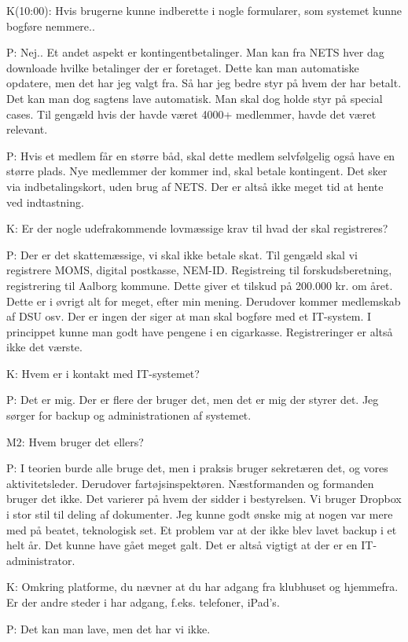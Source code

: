 \documentclass{article}
\begin{document}
K(10:00): Hvis brugerne kunne indberette i nogle formularer, som systemet kunne bogføre nemmere..

P: Nej.. Et andet aspekt er kontingentbetalinger. Man kan fra NETS hver dag downloade hvilke betalinger der er foretaget. Dette kan man automatiske opdatere, men det har jeg valgt fra. Så har jeg bedre styr på hvem der har betalt. Det kan man dog sagtens lave automatisk. Man skal dog holde styr på special cases. Til gengæld hvis der havde været 4000+ medlemmer, havde det været relevant.



P: Hvis et medlem får en større båd, skal dette medlem selvfølgelig også have en større plads. Nye medlemmer der kommer ind, skal betale kontingent. Det sker via indbetalingskort, uden brug af NETS. Der er altså ikke meget tid at hente ved indtastning.

K: Er der nogle udefrakommende lovmæssige krav til hvad der skal registreres?

P: Der er det skattemæssige, vi skal ikke betale skat. Til gengæld skal vi registrere MOMS, digital postkasse, NEM-ID. Registreing til forskudsberetning, registrering til Aalborg kommune. Dette giver et tilskud på 200.000 kr. om året. Dette er i øvrigt alt for meget, efter min mening. Derudover kommer medlemskab af DSU osv. Der er ingen der siger at man skal bogføre med et IT-system. I princippet kunne man godt have pengene i en cigarkasse. Registreringer er altså ikke det værste.

K: Hvem er i kontakt med IT-systemet?

P: Det er mig. Der er flere der bruger det, men det er mig der styrer det. Jeg sørger for backup og administrationen af systemet.

M2: Hvem bruger det ellers?

P: I teorien burde alle bruge det, men i praksis bruger sekretæren det, og vores aktivitetsleder. Derudover fartøjsinspektøren. Næstformanden og formanden bruger det ikke. Det varierer på hvem der sidder i bestyrelsen. Vi bruger Dropbox i stor stil til deling af dokumenter. Jeg kunne godt ønske mig at nogen var mere med på beatet, teknologisk set. Et problem var at der ikke blev lavet backup i et helt år. Det kunne have gået meget galt. Det er altså vigtigt at der er en IT-administrator.

K: Omkring platforme, du nævner at du har adgang fra klubhuset og hjemmefra. Er der andre steder i har adgang, f.eks. telefoner, iPad's.

P: Det kan man lave, men det har vi ikke.
\end{document}
